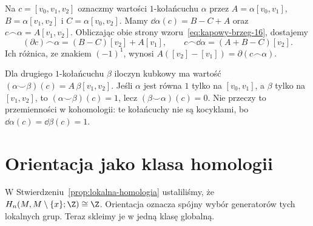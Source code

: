 \begin{przyklad}
\label{prz:kubek-kap-trojkat-21}
Na $c=[v_0,v_1,v_2]$ oznaczmy wartości $1$-kołańcuchu $\alpha$
przez $A=\alpha[v_0,v_1]$, $B=\alpha[v_1,v_2]$ i
$C=\alpha[v_0,v_2]$.
Mamy $\dd\alpha(c)=B-C+A$ oraz $c\frown\alpha=A[v_1,v_2]$.
Obliczając obie strony wzoru~\eqref{eq:kapowy-brzeg-16},
dostajemy
\[
 (\partial c)\frown\alpha=(B-C)[v_2]+A[v_1],\qquad
 c\frown\dd\alpha=(A+B-C)[v_2].
\]
Ich różnica, ze znakiem $(-1)^1$, wynosi
$A([v_2]-[v_1])=\partial(c\frown\alpha)$.

Dla drugiego $1$-kołańcuchu $\beta$ iloczyn kubkowy ma wartość
$(\alpha\smile\beta)(c)=A\,\beta[v_1,v_2]$.
Jeśli $\alpha$ jest równa $1$ tylko na $[v_0,v_1]$,
a $\beta$ tylko na $[v_1,v_2]$, to
$(\alpha\smile\beta)(c)=1$, lecz $(\beta\smile\alpha)(c)=0$.
Nie przeczy to przemienności w kohomologii:
te kołańcuchy nie są kocyklami, bo
$\dd\alpha(c)=\dd\beta(c)=1$.

\begin{center}
\end{center}
\end{przyklad}

\section{Orientacja jako klasa homologii}
\label{sec:klasa-fundamentalna-16}

W Stwierdzeniu~\ref{prop:lokalna-homologia}
ustaliliśmy, że
$H_n(M,M\setminus\{x\};\Z)\cong\Z$.
Orientacja oznacza spójny wybór
generatorów tych lokalnych grup.
Teraz skleimy je w jedną klasę
globalną.

